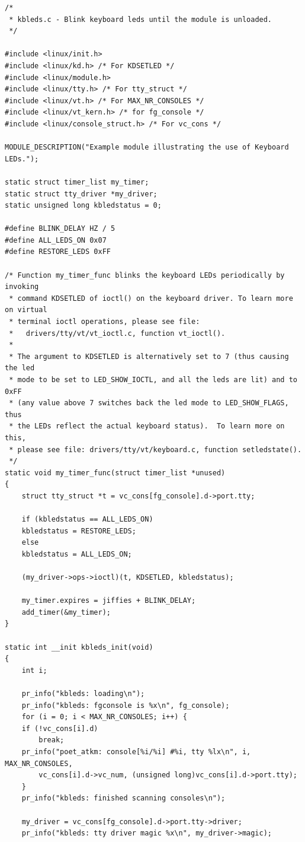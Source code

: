 \documentclass[11pt]{article}
\begin{document}
\begin{verbatim}
/*
 * kbleds.c - Blink keyboard leds until the module is unloaded.
 */

#include <linux/init.h>
#include <linux/kd.h> /* For KDSETLED */
#include <linux/module.h>
#include <linux/tty.h> /* For tty_struct */
#include <linux/vt.h> /* For MAX_NR_CONSOLES */
#include <linux/vt_kern.h> /* for fg_console */
#include <linux/console_struct.h> /* For vc_cons */

MODULE_DESCRIPTION("Example module illustrating the use of Keyboard LEDs.");

static struct timer_list my_timer;
static struct tty_driver *my_driver;
static unsigned long kbledstatus = 0;

#define BLINK_DELAY HZ / 5
#define ALL_LEDS_ON 0x07
#define RESTORE_LEDS 0xFF

/* Function my_timer_func blinks the keyboard LEDs periodically by invoking
 * command KDSETLED of ioctl() on the keyboard driver. To learn more on virtual
 * terminal ioctl operations, please see file:
 *   drivers/tty/vt/vt_ioctl.c, function vt_ioctl().
 *
 * The argument to KDSETLED is alternatively set to 7 (thus causing the led
 * mode to be set to LED_SHOW_IOCTL, and all the leds are lit) and to 0xFF
 * (any value above 7 switches back the led mode to LED_SHOW_FLAGS, thus
 * the LEDs reflect the actual keyboard status).  To learn more on this,
 * please see file: drivers/tty/vt/keyboard.c, function setledstate().
 */
static void my_timer_func(struct timer_list *unused)
{
    struct tty_struct *t = vc_cons[fg_console].d->port.tty;

    if (kbledstatus == ALL_LEDS_ON)
	kbledstatus = RESTORE_LEDS;
    else
	kbledstatus = ALL_LEDS_ON;

    (my_driver->ops->ioctl)(t, KDSETLED, kbledstatus);

    my_timer.expires = jiffies + BLINK_DELAY;
    add_timer(&my_timer);
}

static int __init kbleds_init(void)
{
    int i;

    pr_info("kbleds: loading\n");
    pr_info("kbleds: fgconsole is %x\n", fg_console);
    for (i = 0; i < MAX_NR_CONSOLES; i++) {
	if (!vc_cons[i].d)
	    break;
	pr_info("poet_atkm: console[%i/%i] #%i, tty %lx\n", i, MAX_NR_CONSOLES,
		vc_cons[i].d->vc_num, (unsigned long)vc_cons[i].d->port.tty);
    }
    pr_info("kbleds: finished scanning consoles\n");

    my_driver = vc_cons[fg_console].d->port.tty->driver;
    pr_info("kbleds: tty driver magic %x\n", my_driver->magic);


\end{verbatim}
\end{document}
